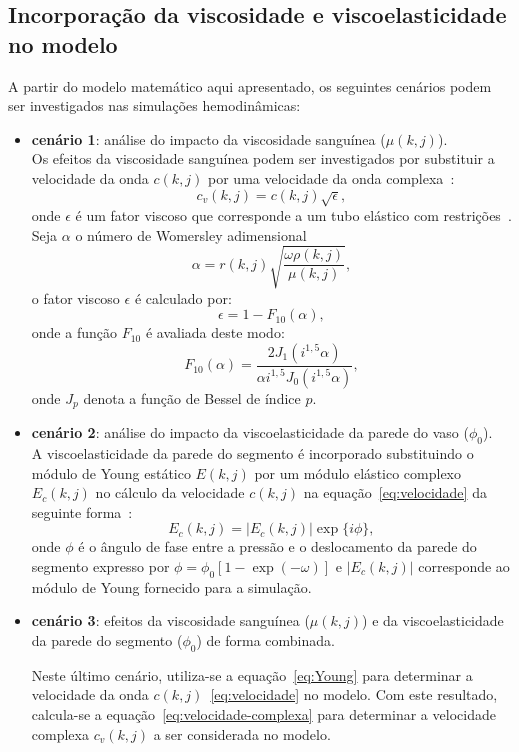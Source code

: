 \documentclass[
        english,			
        brazil			        %
        ,<...>]{abntbibufjf}
\begin{document}
\subsection{Incorporação da viscosidade e viscoelasticidade no modelo}
\label{sec:cenario}
A partir do modelo matemático aqui apresentado, os seguintes cenários podem ser investigados nas simulações hemodinâmicas:
\begin{itemize}
	\item \textbf{cenário 1}: análise do impacto da viscosidade sanguínea ($\mu(k,j)$).\\
	Os efeitos da viscosidade sanguínea podem ser investigados por substituir a velocidade
	da onda $c(k,j)$ por uma velocidade da onda complexa~\cite{Duan1992}:
	\begin{equation} 
	c_v(k,j) = c(k,j) \sqrt{\epsilon},\label{eq:velocidade-complexa}
	\end{equation}
	onde $\epsilon$ é um fator viscoso que corresponde a um tubo elástico com restrições~\cite{Duan1992}. Seja $\alpha$ o
	número de Womersley adimensional
	\begin{equation}
	\alpha = r(k,j) \sqrt{\frac{\omega \rho(k,j)}{\mu(k,j)}},
	\end{equation}
	o fator viscoso $\epsilon$ é calculado por:
	\begin{equation}
	\epsilon = 1 - F_{10} (\alpha),
	\end{equation}
	onde a função $F_{10}$ é avaliada deste modo:
	\begin{equation}
	F_{10} (\alpha) = \frac{2 J_1(i^{1,5} \alpha)}{\alpha i^{1,5}J_0(i^{1,5} \alpha)},
	\end{equation}
	onde $J_p$ denota a função de Bessel de índice $p$.
	
	\item \textbf{cenário 2}: análise do impacto da viscoelasticidade da parede do vaso ($\phi_0$).\\
	A viscoelasticidade da parede do segmento é incorporado substituindo o módulo de Young
	estático $E(k,j)$ por um módulo elástico complexo $E_c(k,j)$ no cálculo da velocidade $c(k,j)$ na equação~\eqref{eq:velocidade}
	da seguinte forma~\cite{Duan}:
	\begin{equation}
	E_c(k,j) = |E_c(k,j)| \exp\{i\phi\},\label{eq:Young}
	\end{equation}
	onde $\phi$ é o ângulo de fase entre a pressão e o deslocamento da parede do segmento \cite{Taylor3} expresso por $\phi = \phi_0 [1-\exp(-\omega)]$ e $|E_c (k,j)|$ corresponde ao módulo de Young fornecido para a simulação.
	
	\item \textbf{cenário 3}: efeitos da viscosidade sanguínea ($\mu(k,j)$) e da viscoelasticidade da parede do segmento ($\phi_0$) de forma combinada.
	
	Neste último cenário, utiliza-se a equação~\eqref{eq:Young} para determinar a velocidade da onda $c(k,j)$~\eqref{eq:velocidade} no modelo. Com este resultado, calcula-se  a equação~\eqref{eq:velocidade-complexa} para determinar a velocidade complexa $c_v(k,j)$ a ser considerada no modelo.
\end{itemize}
\end{document}
